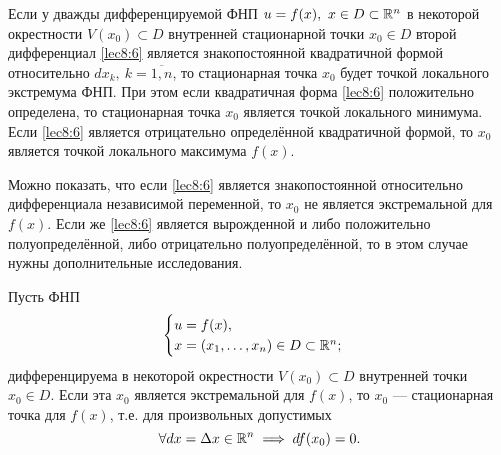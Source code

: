 \documentclass[../main.tex]{subfiles}
\begin{document}
\begin{thm}
        Если у дважды дифференцируемой ФНП $u=f(x),\ x \in D \subset \mathbb{R}^n$
        в некоторой окрестности $V(x_0) \subset D$ внутренней стационарной
        точки $x_0 \in D$ второй дифференциал \eqref{lec8:6} является
        знакопостоянной квадратичной формой относительно $dx_k,\ k =
        \overline{1, n}$, то стационарная точка $x_0$ будет точкой локального
        экстремума ФНП. При этом если квадратичная форма \eqref{lec8:6}
        положительно определена, то стационарная точка $x_0$ является точкой
        локального минимума. Если \eqref{lec8:6} является отрицательно
        определённой квадратичной формой, то $x_0$ является точкой локального
        максимума $f(x)$.
    \end{thm}
\begin{rem}
        Можно показать, что если \eqref{lec8:6} является знакопостоянной
        относительно дифференциала независимой переменной, то $x_0$ не
        является экстремальной для $f(x)$. Если же \eqref{lec8:6} является
        вырожденной и либо положительно полуопределённой, либо отрицательно
        полуопределённой, то в этом случае нужны дополнительные исследования.
    \end{rem}
\begin{thm}
		Пусть ФНП
		\[
		\begin{cases}
			u = f (x), \\
			x = (x_1, \ldots, x_n) \in D \subset \mathbb{R}^n; \\
		\end{cases}
		\]
		дифференцируема в некоторой окрестности $V (x_0) \subset D$
		внутренней точки $x_0 \in D$. Если эта $x_0$ является экстремальной
		для $f (x)$, то $x_0$ --- стационарная точка
		для $f (x)$, т.е. для произвольных допустимых
		\begin{equation}
		\label{nec cond loc extr}
			\forall dx = \Delta x \in \mathbb{R}^n \implies df (x_0) = 0.
		\end{equation}
	\end{thm}
\end{document}
